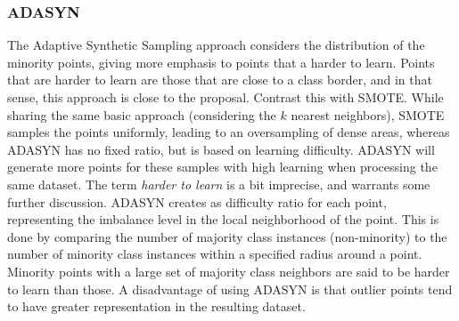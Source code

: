 \documentclass[letterpaper]{article}
\begin{document}
{\subsubsection{ADASYN}
The Adaptive Synthetic Sampling approach considers the distribution of the minority points, giving more emphasis to points that a harder to learn. \cite{He2008-xr} Points that are harder to learn are those that are close to a class border, and in that sense, this approach is close to the  proposal. Contrast this with SMOTE. While sharing the same basic approach (considering the $k$ nearest neighbors), SMOTE samples the points uniformly, leading to an oversampling of dense areas, whereas ADASYN has no fixed ratio, but is based on learning difficulty. ADASYN will generate more points for these samples with high learning when processing the same dataset. The term \textit{harder to learn} is a bit imprecise, and warrants some further discussion. ADASYN creates as difficulty ratio for each point, representing the imbalance level in the local neighborhood of the point. This is done by comparing the number of majority class instances (non-minority) to the number of minority class instances within a specified radius around a point. Minority points with a large set of majority class neighbors are said to be harder to learn than those. A disadvantage of using ADASYN is that outlier points tend to have greater representation in the resulting dataset.

}
\end{document}
